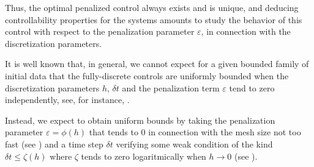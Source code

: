 Thus, the optimal penalized control always exists and is unique, and deducing controllability properties for the systems amounts to study the behavior of this control with respect to the penalization parameter $\varepsilon$, in connection with the discretization parameters.  

It is well known that, in general, we cannot expect for a given bounded family of initial data that the fully-discrete controls are uniformly bounded when the discretization parameters $h$, $\delta t$ and the penalization term $\varepsilon$ tend to zero independently, see, for instance, \cite{}. 

Instead, we expect to obtain uniform bounds by taking the penalization parameter $\varepsilon=\phi(h)$ that tends to 0 in connection with the mesh size not too fast (see \cite{}) and a time step $\delta t$ verifying some weak condition of the kind $\delta t\leq \zeta(h)$ where $\zeta$ tends to zero logaritmically when $h\to 0$ (see \cite{}).
%
